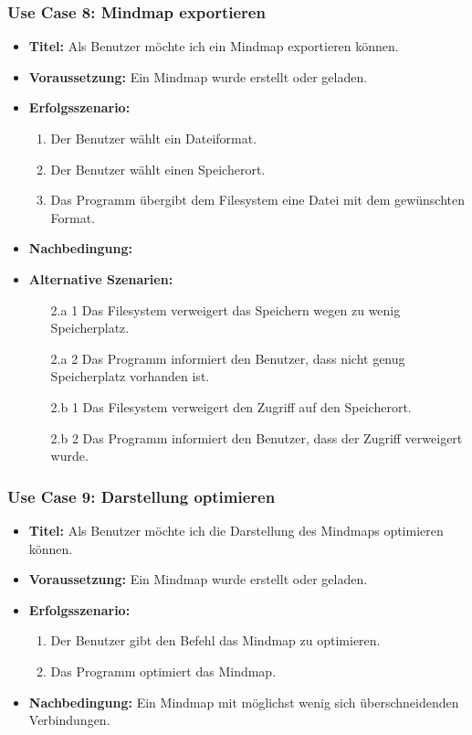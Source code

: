 \subsubsection{Use Case 8: Mindmap exportieren}
\begin{itemize}
\item \textbf{Titel:} Als Benutzer möchte ich ein Mindmap exportieren können.
\item \textbf{Voraussetzung:} Ein Mindmap wurde erstellt oder geladen.
\item \textbf{Erfolgsszenario:}
	\begin{enumerate}
	\item Der Benutzer wählt ein Dateiformat.
	\item Der Benutzer wählt einen Speicherort.
	\item Das Programm übergibt dem Filesystem eine Datei mit dem gewünschten Format.
	\end{enumerate}
\item \textbf{Nachbedingung:}
\item \textbf{Alternative Szenarien:}
	\begin{enumerate}
	\item [2.a 1] Das Filesystem verweigert das Speichern wegen zu wenig Speicherplatz.
	\item [2.a 2] Das Programm informiert den Benutzer, dass nicht genug Speicherplatz vorhanden ist.
	\item []
	\item [2.b 1] Das Filesystem verweigert den Zugriff auf den Speicherort.
	\item [2.b 2] Das Programm informiert den Benutzer, dass der Zugriff verweigert wurde.
	\end{enumerate}
\end{itemize}

\subsubsection{Use Case 9: Darstellung optimieren}
\begin{itemize}
\item \textbf{Titel:} Als Benutzer möchte ich die Darstellung des Mindmaps optimieren können.
\item \textbf{Voraussetzung:} Ein Mindmap wurde erstellt oder geladen.
\item \textbf{Erfolgsszenario:}
	\begin{enumerate}
	\item Der Benutzer gibt den Befehl das Mindmap zu optimieren.
	\item Das Programm optimiert das Mindmap.
	\end{enumerate}
\item \textbf{Nachbedingung:} Ein Mindmap mit möglichst wenig sich überschneidenden Verbindungen.
\end{itemize}

